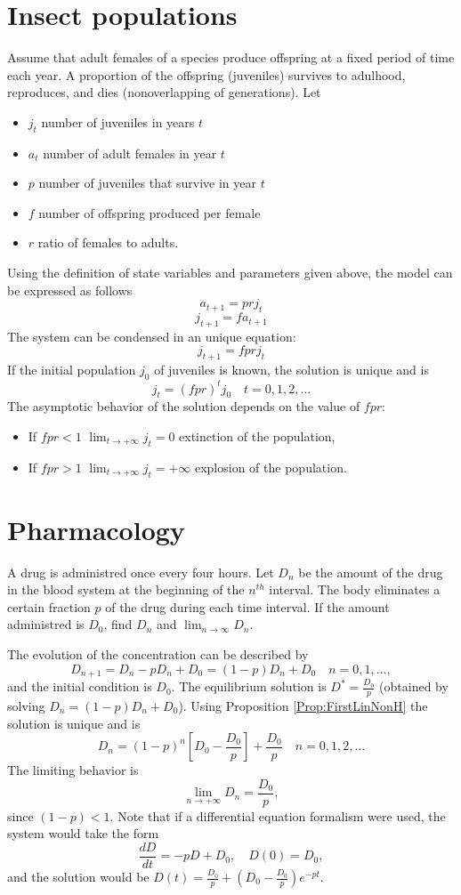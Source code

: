 \section{Insect populations}
Assume that adult females of a species produce offspring at a fixed period of time each year. A proportion of the offspring (juveniles) survives to adulhood, reproduces, and dies (nonoverlapping of generations). Let
\begin{itemize}
\item $j_t$ number of juveniles in years $t$
\item $a_t$ number of adult females in year $t$
\item $p$ number of juveniles that survive in year $t$
\item $f$ number of offspring produced per female
\item $r$ ratio of females to adults.
\end{itemize}
Using the definition of state variables and parameters given above, the model can be expressed as follows
$$a_{t+1}=prj_t$$
$$j_{t+1}=f a_{t+1}$$
The system can be condensed in an unique equation:
$$j_{t+1}=f prj_t$$
If the initial population $j_0$ of juveniles is known, the solution is unique and is
$$j_t=(f pr)^tj_0 \quad t=0,1,2,\dots$$
The asymptotic behavior of the solution depends on the value of $f pr$:
\begin{itemize}
\item If $f pr<1$ $\lim_{t\rightarrow +\infty} j_t=0$ extinction of the population,
\item If $f pr>1$ $\lim_{t\rightarrow +\infty} j_t=+\infty$ explosion of the population.
\end{itemize}


\section{Pharmacology}
A drug is administred once every four hours. Let $D_n$ be the amount of the drug in the blood system at the beginning of the $n^{th}$ interval.  The body eliminates a certain fraction $p$ of the drug during each time interval. If the amount administred is $D_0$, find $D_n$ and $\lim_{n\rightarrow\infty}D_{n}$.

The evolution of the concentration can be described by 
\[
D_{n+1}=D_n-pD_n +D_0=(1-p)D_n +D_0 \quad n=0,1,\dots,
\]
and the initial condition is $D_0$.
The equilibrium solution is $D^*=\frac{D_0}{p}$ (obtained by solving $D_{n}=(1-p)D_n +D_0$).
Using Proposition \ref{Prop:FirstLinNonH} the solution is unique and is
\[
D_n=(1-p)^n\left [D_0-\frac{D_0}{p}\right ] +\frac{D_0}{p} \quad n=0,1,2,\ldots
\]
The limiting behavior is
\[
\lim _{n\rightarrow +\infty}D_n=\frac{D_0}{p},
\]
since $(1-p)<1$.
Note that if a differential equation formalism were used, the system would take the form
$$\frac{dD}{dt}=-pD +D_0, \quad D(0)=D_0,$$
and the solution would be $D(t)=\frac{D_0}{p}+(D_0-\frac{D_0}{p})e^{-pt}$.

